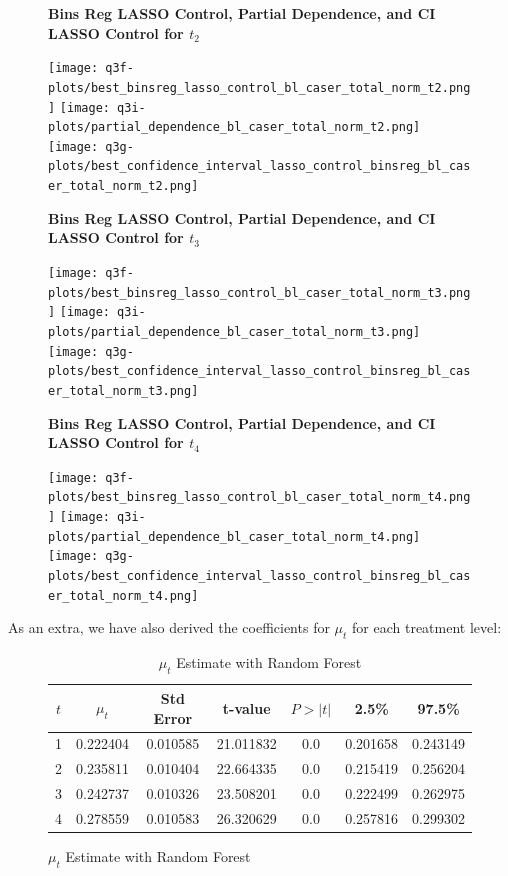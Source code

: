 \documentclass{article}
\begin{document}
{\begin{figure}[H]
  \textbf{Bins Reg LASSO Control, Partial Dependence, and CI LASSO Control for $t_2$}

  \texttt{[image: q3f-plots/best\_binsreg\_lasso\_control\_bl\_caser\_total\_norm\_t2.png]}
  \texttt{[image: q3i-plots/partial\_dependence\_bl\_caser\_total\_norm\_t2.png]}
  \texttt{[image: q3g-plots/best\_confidence\_interval\_lasso\_control\_binsreg\_bl\_caser\_total\_norm\_t2.png]}

  \textbf{Bins Reg LASSO Control, Partial Dependence, and CI LASSO Control for $t_3$}

  \texttt{[image: q3f-plots/best\_binsreg\_lasso\_control\_bl\_caser\_total\_norm\_t3.png]}
  \texttt{[image: q3i-plots/partial\_dependence\_bl\_caser\_total\_norm\_t3.png]}
  \texttt{[image: q3g-plots/best\_confidence\_interval\_lasso\_control\_binsreg\_bl\_caser\_total\_norm\_t3.png]}

  \textbf{Bins Reg LASSO Control, Partial Dependence, and CI LASSO Control for $t_4$}

  \texttt{[image: q3f-plots/best\_binsreg\_lasso\_control\_bl\_caser\_total\_norm\_t4.png]}
  \texttt{[image: q3i-plots/partial\_dependence\_bl\_caser\_total\_norm\_t4.png]}
  \texttt{[image: q3g-plots/best\_confidence\_interval\_lasso\_control\_binsreg\_bl\_caser\_total\_norm\_t4.png]}

\end{figure}
}

As an extra, we have also derived the coefficients for $\mu_t$ for each treatment level:

\begin{figure}[H]
  \begin{table}[H]
  \centering
  \begin{tabular}{|ccccccc|}
    \hline
    $t$ & $\mu_t$	& Std Error &	t-value	& $P>|t|$	& 2.5\%	& 97.5\% \\
    \hline
    1	& 0.222404 & 0.010585	& 21.011832	& 0.0 &	0.201658 & 0.243149 \\
    2	& 0.235811 & 0.010404	& 22.664335	& 0.0 &	0.215419 & 0.256204 \\
    3	& 0.242737 & 0.010326	& 23.508201	& 0.0 &	0.222499 & 0.262975 \\
    4	& 0.278559 & 0.010583	& 26.320629	& 0.0 &	0.257816 & 0.299302 \\
    \hline
  \end{tabular}
  \caption{$\mu_t$ Estimate with Random Forest}
\end{table}
\end{figure}
\end{document}

